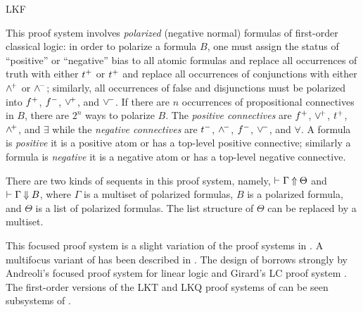 \begin{entry}{LKF}
\begin{clarifications}
This proof system involves \emph{polarized} (negative normal) formulas
of first-order classical logic: in order to polarize a formula $B$,
one must assign the status of ``positive'' or ``negative'' bias to all
atomic formulas and replace all occurrences of truth with either
$t^+$ or $t^+$ and replace all occurrences of conjunctions with
either $\wedge^{\!+}$ or $\wedge^{\!-}$; similarly, all occurrences of false and
disjunctions must be polarized into $f^+$, $f^-$, $\vee^{\!+}$, and
$\vee^{\!-}$. If there are $n$ occurrences of propositional connectives
in $B$, there are $2^n$ ways to polarize $B$.
The \emph{positive connectives} are $f^+$, $\vee^{\!+}$, $t^+$,
$\wedge^{\!+}$, and $\exists$ while the \emph{negative connectives} are
$t^-$, $\wedge^{\!-}$, $f^-$, $\vee^{\!-}$, and $\forall$.
A formula is \emph{positive} it is a positive atom or has a top-level
positive connective; similarly a formula is \emph{negative} it is a
negative atom or has a top-level negative connective.

There are two kinds of sequents in this proof system, namely,
$\vdash\Gamma\mathbin{\Uparrow} \Theta$ and $\vdash\Gamma\mathbin{\Downarrow} B$, where $\Gamma$ is a
multiset of polarized formulas, $B$ is a polarized formula, and
$\Theta$ is a list of polarized formulas.  The list structure of
$\Theta$ can be replaced by a multiset.
\end{clarifications}

\begin{history}
This focused proof system is a slight variation of the proof systems in
\cite{liang09tcs,liang07csl}.  
A multifocus variant of \LKF has been described in \cite{chaudhuri14jlc}.
The design of \LKF borrows strongly by Andreoli's focused proof system for
linear logic \cite{andreoli92jlc} and Girard's LC proof
system \cite{girard91mscs}.  The first-order versions 
of the LKT and LKQ proof systems of \cite{danos93wll} can be seen 
subsystems of \LKF.
\end{history}

\end{entry}
